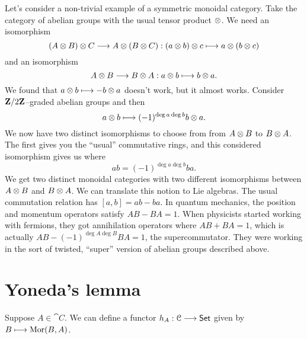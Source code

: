 \documentclass[11pt, oneside]{article}
\begin{document}
Let's consider a non-trivial example of a symmetric monoidal category. Take the category of abelian groups with the usual tensor product $\otimes$. We need an isomorphism 
$$
(A\otimes B)\otimes C \longrightarrow A \otimes (B\otimes C) : (a\otimes b)\otimes c \longmapsto a \otimes (b\otimes c) 
$$
and an isomorphism
$$
A \otimes B \longrightarrow B\otimes A : a\otimes b\longmapsto b\otimes a.
$$ 
We found that $a\otimes b\longmapsto -b\otimes a$ doesn't work, but it almost works. Consider $\mathbf Z/2\mathbf Z$--graded abelian groups and then
$$
a\otimes b \longmapsto (-1)^{\deg a  \deg b}b\otimes a.
$$
We now have two distinct isomorphisms to choose from from $A\otimes B$ to $B\otimes A$. The first gives you the ``usual'' commutative rings, and this considered isomorphism gives us \href{https://en.wikipedia.org/wiki/Supercommutative_algebra}{} where 
$$
ab = (-1)^ {\deg a  \deg b}b a.
$$
We get two distinct monoidal categories with two different isomorphisms between $A\otimes B$ and $B\otimes A$. We can translate this notion to Lie algebras. The usual commutation relation has $[a,b] = ab-ba$. In quantum mechanics, the position and momentum operators satisfy $AB-BA=1$. When physicists started working with fermions, they got annihilation operators where $AB+BA =1$, which is actually $AB - (-1)^{\deg A \deg B} BA = 1$, the supercommutator. They were working in the sort of twisted, ``super'' version of abelian groups described above.

\section{Yoneda's lemma}
Suppose $A \in \cat C$. We can define a functor $h_A:\mathcal C \longrightarrow \textsf{Set}$ given by $B \longmapsto \operatorname{Mor}(B,A)$.
\newpage


\printindex
\end{document}
